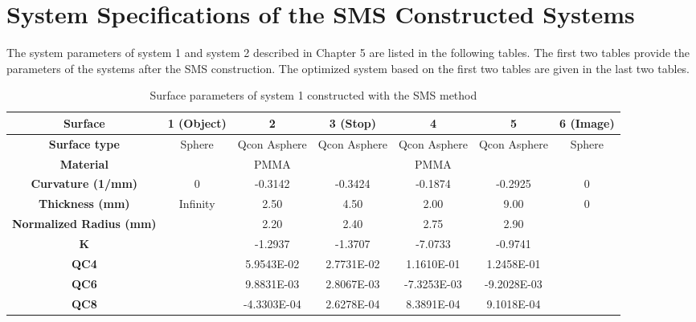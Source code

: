 \newpage
\section{System Specifications of the SMS Constructed Systems} 
\label{apdx: chapter-5-system-spec}

The system parameters of system 1 and system 2 described in Chapter 5 are listed in the following tables. The first two tables provide the parameters of the systems after the SMS construction. The optimized system based on the first two tables are given in the last two tables. 

\setlength{\arrayrulewidth}{.5mm}
\setlength{\tabcolsep}{18pt}
\renewcommand{\arraystretch}{1.2}
\begin{table}[h!]
    \centering
    \captionsetup{justification=centering}
    \caption{Surface parameters of system 1 constructed with the SMS method}
    \label{table: chap5 - sys1 - SMS}
    \vspace{-1em}
    \begin{adjustbox}{max width=\textwidth, center}
    \begin{tabular}{c c c c c c c}
    \hline 
     \textbf{Surface} & \textbf{1 (Object)} & \textbf{2} & \textbf{3 (Stop)} & \textbf{4} & \textbf{5} & \textbf{6 (Image)}\\ 
     \midrule
    \rowcolor[gray]{0.9}  \textbf{Surface type} & Sphere & Qcon Asphere & Qcon Asphere & Qcon Asphere & Qcon Asphere & Sphere \\ 
    \textbf{Material} &  & PMMA &  & PMMA & & \\
   \rowcolor[gray]{0.9}  \textbf{Curvature (1/mm)} & 0 & -0.3142 & -0.3424 & -0.1874 &-0.2925 & 0\\
    \textbf{Thickness (mm)} & Infinity & 2.50 & 4.50 & 2.00 & 9.00 & 0 \\ 
    \rowcolor[gray]{0.9} \textbf{Normalized Radius (mm)} & & 2.20 & 2.40 & 2.75 & 2.90 & \\
    \textbf{K} & & -1.2937 & -1.3707 & -7.0733 & -0.9741&\\
    \rowcolor[gray]{0.9} \textbf{QC4} & & 5.9543E-02 & 2.7731E-02 & 1.1610E-01 &  1.2458E-01 &  \\ 
    \textbf{QC6} & &  9.8831E-03 & 2.8067E-03 & -7.3253E-03 & -9.2028E-03 &\\
   \rowcolor[gray]{0.9}  \textbf{QC8} & & -4.3303E-04 &  2.6278E-04 &  8.3891E-04 &  9.1018E-04 & \\

\end{tabular}
\end{adjustbox}
\end{table}
